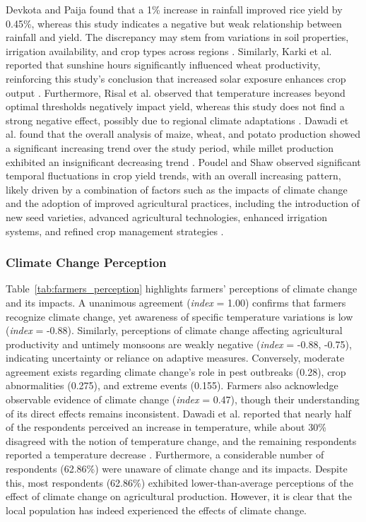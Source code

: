  Devkota and Paija found that a 1\% increase in rainfall improved rice yield by 0.45\%, whereas this study indicates a negative but weak relationship between rainfall and yield. The discrepancy may stem from variations in soil properties, irrigation availability, and crop types across regions \citep{devkotaImpactClimateChange2020}. Similarly, Karki et al. reported that sunshine hours significantly influenced wheat productivity, reinforcing this study’s conclusion that increased solar exposure enhances crop output  \citep{karkiStatusDriversFood2021}. Furthermore, Risal et al. observed that temperature increases beyond optimal thresholds negatively impact yield, whereas this study does not find a strong negative effect, possibly due to regional climate adaptations  \citep{risalImpactClimateChange2022}. Dawadi et al. found that the overall analysis of maize, wheat, and potato production showed a significant increasing trend over the study period, while millet production exhibited an insignificant decreasing trend \citep{dawadiImpactClimateChange2022}. Poudel and Shaw observed significant temporal fluctuations in crop yield trends, with an overall increasing pattern, likely driven by a combination of factors such as the impacts of climate change and the adoption of improved agricultural practices, including the introduction of new seed varieties, advanced agricultural technologies, enhanced irrigation systems, and refined crop management strategies \citep{poudelRelationshipsClimateVariability2016}.


\subsubsection{Climate Change Perception}


Table~\ref{tab:farmers_perception} highlights farmers' perceptions of climate change and its impacts. A unanimous agreement (\textit{index} = 1.00) confirms that farmers recognize climate change, yet awareness of specific temperature variations is low (\textit{index} = -0.88). Similarly, perceptions of climate change affecting agricultural productivity and untimely monsoons are weakly negative (\textit{index} = -0.88, -0.75), indicating uncertainty or reliance on adaptive measures. Conversely, moderate agreement exists regarding climate change’s role in pest outbreaks (0.28), crop abnormalities (0.275), and extreme events (0.155). Farmers also acknowledge observable evidence of climate change (\textit{index} = 0.47), though their understanding of its direct effects remains inconsistent. Dawadi et al. reported that nearly half of the respondents perceived an increase in temperature, while about 30\% disagreed with the notion of temperature change, and the remaining respondents reported a temperature decrease \citep{dawadiImpactClimateChange2022}. Furthermore, a considerable number of respondents (62.86\%) were unaware of climate change and its impacts. Despite this, most respondents (62.86\%) exhibited lower-than-average perceptions of the effect of climate change on agricultural production. However, it is clear that the local population has indeed experienced the effects of climate change.

